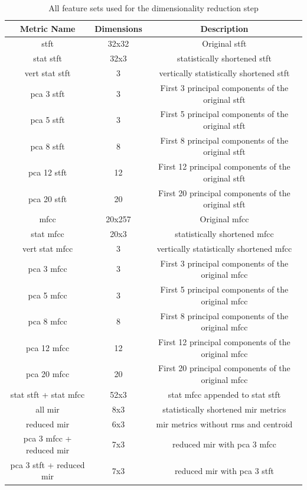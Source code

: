 \documentclass[11pt]{article}
\begin{document}
\begin{table}[h!]
\centering
\begin{tabular}{ |c|c|c| }
\hline
Metric Name & Dimensions & Description \\
\hline
stft & 32x32 & Original stft \\
stat stft & 32x3 & statistically shortened stft \\
vert stat stft & 3 & vertically statistically shortened stft \\
pca 3 stft & 3 & First 3 principal components of the original stft \\
pca 5 stft & 3 & First 5 principal components of the original stft \\
pca 8 stft & 8 & First 8 principal components of the original stft \\
pca 12 stft & 12 & First 12 principal components of the original stft \\
pca 20 stft & 20 & First 20 principal components of the original stft \\
mfcc & 20x257 & Original mfcc \\
stat mfcc & 20x3 & statistically shortened mfcc \\
vert stat mfcc & 3 & vertically statistically shortened mfcc \\
pca 3 mfcc & 3 & First 3 principal components of the original mfcc \\
pca 5 mfcc & 3 & First 5 principal components of the original mfcc \\
pca 8 mfcc & 8 & First 8 principal components of the original mfcc \\
pca 12 mfcc & 12 & First 12 principal components of the original mfcc \\
pca 20 mfcc & 20 & First 20 principal components of the original mfcc \\
stat stft + stat mfcc & 52x3 & stat mfcc appended to stat stft \\
all mir & 8x3 & statistically shortened mir metrics \\
reduced mir & 6x3 & mir metrics without rms and centroid \\
pca 3 mfcc + reduced mir & 7x3 & reduced mir with pca 3 mfcc \\
pca 3 stft + reduced mir & 7x3 & reduced mir with pca 3 stft \\
\hline
\end{tabular}
\caption{All feature sets used for the dimensionality reduction step}
\label{table:all_features}
\end{table}
\end{document}
